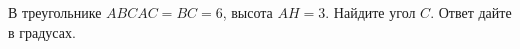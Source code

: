 \begin{ex}
	\begin{condition}
		В треугольнике \(ABC AC=BC=6\), высота \( AH=3 \). Найдите угол \( C \). Ответ дайте в градусах.
	\end{condition}
\end{ex}